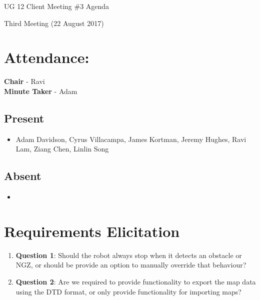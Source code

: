 \documentclass{article}
\begin{document}
\begin{adjustwidth}{2.5em}{0pt}
\begin{center}
\Large{UG 12 Client Meeting \#3 Agenda}\\
\end{center}
\end{adjustwidth}
Third Meeting (22 August 2017)
\section{Attendance:}
\textbf{Chair} - Ravi\\
\textbf{Minute Taker} - Adam\\
\subsection*{Present}
\begin{itemize}
\item Adam Davidson, Cyrus Villacampa, James Kortman, Jeremy Hughes, Ravi Lam, Ziang Chen, Linlin Song
\end{itemize}
\subsection*{Absent}
\begin{itemize}
\item
\end {itemize}
\section{Requirements Elicitation}
\begin{enumerate}
\item[] \textbf{Question 1}: Should the robot always stop when it detects an obstacle or NGZ, or should be provide an option to manually override that behaviour?
\item[] \textbf{Question 2}: Are we required to provide functionality to export the map data using the DTD format, or only provide functionality for importing maps?
\end{enumerate}
\end{document}
